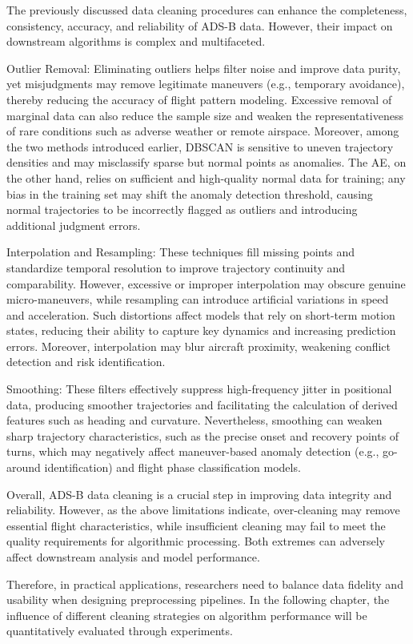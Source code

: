 The previously discussed data cleaning procedures can enhance the completeness, consistency, accuracy, and reliability of ADS-B data. However, their impact on downstream algorithms is complex and multifaceted.

Outlier Removal: Eliminating outliers helps filter noise and improve data purity, yet misjudgments may remove legitimate maneuvers (e.g., temporary avoidance), thereby reducing the accuracy of flight pattern modeling. Excessive removal of marginal data can also reduce the sample size and weaken the representativeness of rare conditions such as adverse weather or remote airspace. Moreover, among the two methods introduced earlier, DBSCAN is sensitive to uneven trajectory densities and may misclassify sparse but normal points as anomalies. The AE, on the other hand, relies on sufficient and high-quality normal data for training; any bias in the training set may shift the anomaly detection threshold, causing normal trajectories to be incorrectly flagged as outliers and introducing additional judgment errors.

Interpolation and Resampling: These techniques fill missing points and standardize temporal resolution to improve trajectory continuity and comparability. However, excessive or improper interpolation may obscure genuine micro-maneuvers, while resampling can introduce artificial variations in speed and acceleration. Such distortions affect models that rely on short-term motion states, reducing their ability to capture key dynamics and increasing prediction errors. Moreover, interpolation may blur aircraft proximity, weakening conflict detection and risk identification.

Smoothing: These filters effectively suppress high-frequency jitter in positional data, producing smoother trajectories and facilitating the calculation of derived features such as heading and curvature. Nevertheless, smoothing can weaken sharp trajectory characteristics, such as the precise onset and recovery points of turns, which may negatively affect maneuver-based anomaly detection (e.g., go-around identification) and flight phase classification models.

Overall, ADS-B data cleaning is a crucial step in improving data integrity and reliability. However, as the above limitations indicate, over-cleaning may remove essential flight characteristics, while insufficient cleaning may fail to meet the quality requirements for algorithmic processing. Both extremes can adversely affect downstream analysis and model performance.

Therefore, in practical applications, researchers need to balance data fidelity and usability when designing preprocessing pipelines. In the following chapter, the influence of different cleaning strategies on algorithm performance will be quantitatively evaluated through experiments.
